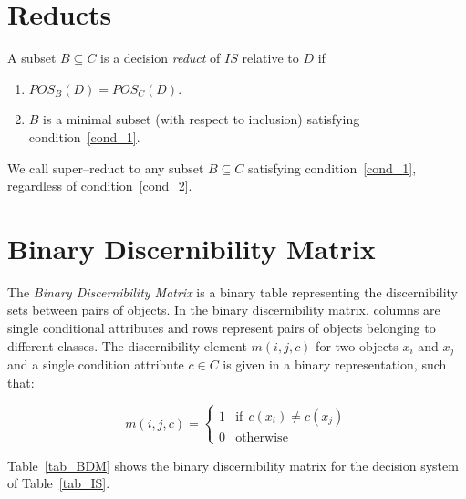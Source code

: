 \documentclass[letterpaper, twoside, openright, 12pt]{book}%
\begin{document}
	\section{Reducts}\label{def_reduct}
	  A subset $B \subseteq C$ is a decision \textit{reduct} of $IS$ relative to $D$ if
	  \begin{enumerate}
	  	\item $POS_B(D)=POS_C(D)$. \label{cond_1}
	  	\item $B$ is a minimal subset (with respect to inclusion) satisfying condition~\ref{cond_1}.\label{cond_2}
	  \end{enumerate}
	
	  We call super--reduct to any subset $B \subseteq C$ satisfying condition~\ref{cond_1}, regardless of condition~\ref{cond_2}.
	  
	\section{Binary Discernibility Matrix}
	  The \textit{Binary Discernibility Matrix} is a binary table representing the discernibility sets between pairs 
	  of objects. In the binary discernibility matrix, columns are single conditional attributes and rows represent pairs of objects belonging to different classes. The discernibility element $m(i, j, c)$ for two objects $x_i$ and $x_j$ and a single condition attribute $c \in C$ is given in a binary representation, such that:
	  
	  \begin{equation}
	  	m(i, j, c)=\left\lbrace\begin{array}{cl}
	  			1 & \mathrm{if~~}c(x_i) \neq c(x_j) \\
	  			0 								   & \mathrm{otherwise} 
	  	\end{array}\right.
	  \end{equation} 
	  
	  Table~\ref{tab_BDM} shows the binary discernibility matrix for the decision system of Table~\ref{tab_IS}.  
	  
\end{document}
